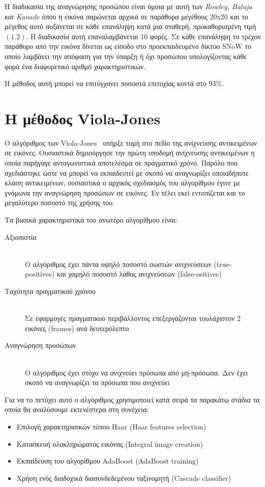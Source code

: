 Η διαδικασία της αναγνώρησης προσώπου είναι όμοια με αυτή των \emph{Rowley, Baluja και Kanade}
όπου η εικόνα σαρώνεται αρχικά σε παράθυρα μεγέθους 20x20 και το μέγεθος αυτό
αυξάνεται σε κάθε επανάληψη κατά μια σταθερή, προκαθορισμένη τιμή $(1.2)$. Η
διαδικασία αυτή επαναλαμβάνεται 10 φορές. Σε κάθε επανάληψη το τρέχον παράθυρο
από την εικόνα δίνεται ως είσοδο στο προεκπαιδευμένο δίκτυο SNoW το οποίο λαμβάνει
την απόφαση για την ύπαρξη ή όχι προσώπου υπολογίζοντας κάθε φορά ένα διαφορετικό
αριθμό χαρακτηριστικών.

Η μέθοδος αυτή μπορεί να επιτύγχανει ποσοστά επιτυχίας κοντά στο $93\%$.

\section{H μέθοδος Viola-Jones}\label{sec:violjon}

O αλγόριθμος των Viola-Jones~\cite{Viola01rapidobject} υπήρξε τομή στο πεδίο
της ανίχνευσης αντικειμένων σε εικόνες. Ουσιαστικά δημιούργησε την πρώτη
υποδομή ανίχνευσης αντικειμένων η οποία παρήγαγε ανταγωνιστικά αποτελέσμα σε
πραγματικό χρόνο. Παρόλο που σχεδιάστηκε ώστε να μπορεί να εκπαιδευτεί με σκοπό
να αναγνωρίζει οποιαδήποτε κλάση αντικειμένων, ουσιαστικά ο αρχικός σχεδιασμός
του αλγορίθμου έγινε με γνόμωνα την αναγνώρηση προσώπων σε εικόνες. Εν τέλει
εκεί εντοπίζεται και το μεγαλύτερο ποσοστό της χρήσης του.

Τα βασικά χαρακτηριστικά του ανωτέρο αλγορίθμου είναι:
\begin{description}
  \item[Αξιοπιστία] \hfill \\
      Ο αλγόριθμος έχει πάντα υψηλό ποσοστό σωστών ανιχνεύσεων (true-positives)
        και χαμηλό ποσοστό λάθος ανιχνεύσεων (false-ositives)
  \item[Ταχύτητα πραγματικού χρόνου] \hfill \\
      Σε εφαρμογές πραγματικού περιβάλλοντος επεξεργάζονται τουλάχιστον 2 εικόνες
        (frames) ανά δευτερόλεπτο
  \item[Αναγνώρηση προσώπων] \hfill \\
      Ο αλγόριθμος έχει στόχο να ανιχνεύει πρόσωπα από μη-πρόσωπα. Δεν έχει
        σκοπό να αναγνωρίζει τα πρόσωπα που ανιχνεύει
\end{description}

Για να το πετύχει αυτό ο αλγόριθμος χρησιμοποιεί κατά σειρά τα παρακάτω στάδια
τα οποία θα αναλύσουμε εκτενέστερα στη συνέχεια:
\begin{itemize}
 \item Επιλογή χαρακτηρισικών τύπου Haar (Haar features selection)
 \item Κατασκευή ολοκληρώματος εικόνας (Integral image creation)
 \item Εκπαίδευση του αλγορίθμου AdaBoost (AdaBoost training)
 \item Χρήση ενός διαδοχικά διασυνδεδεμένου ταξινομητή (Cascade classifier)
\end{itemize}


